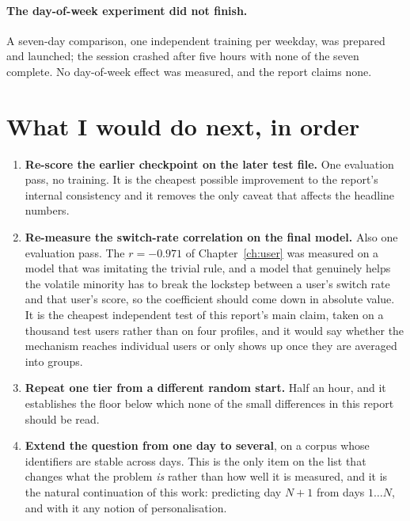 \paragraph{The day-of-week experiment did not finish.} A seven-day comparison,
one independent training per weekday, was prepared and launched; the session
crashed after five hours with none of the seven complete. No day-of-week effect
was measured, and the report claims none.

\section{What I would do next, in order}

\begin{enumerate}
  \item \textbf{Re-score the earlier checkpoint on the later test file.} One
        evaluation pass, no training. It is the cheapest possible improvement to
        the report's internal consistency and it removes the only caveat that
        affects the headline numbers.
  \item \textbf{Re-measure the switch-rate correlation on the final model.} Also
        one evaluation pass. The $r = -0.971$ of Chapter~\ref{ch:user} was
        measured on a model that was imitating the trivial rule, and a model that
        genuinely helps the volatile minority has to break the lockstep between a
        user's switch rate and that user's score, so the coefficient should come
        down in absolute value. It is the cheapest independent test of this
        report's main claim, taken on a thousand test users rather than on four
        profiles, and it would say whether the mechanism reaches individual users
        or only shows up once they are averaged into groups.
  \item \textbf{Repeat one tier from a different random start.} Half an hour,
        and it establishes the floor below which none of the small differences
        in this report should be read.
  \item \textbf{Extend the question from one day to several}, on a corpus whose
        identifiers are stable across days. This is the only item on the list
        that changes what the problem \emph{is} rather than how well it is
        measured, and it is the natural continuation of this work: predicting
        day $N{+}1$ from days $1 \ldots N$, and with it any notion of
        personalisation.
\end{enumerate}
